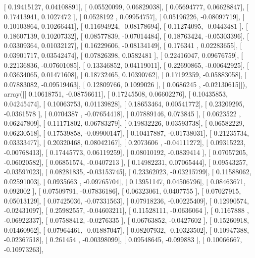 \documentclass{article}
\begin{document}
       [ 0.19415127,  0.04108891],
       [ 0.05520099,  0.06829038],
       [ 0.05694777,  0.06628847],
       [ 0.17413941,  0.1027472 ],
       [ 0.0528192 ,  0.09954757],
       [ 0.05196226, -0.08097719],
       [ 0.10103864,  0.10266441],
       [ 0.11694924, -0.08178694],
       [ 0.11274095, -0.0443481 ],
       [ 0.18607139,  0.10207332],
       [ 0.08577839, -0.07014484],
       [ 0.18763424, -0.05303396],
       [ 0.03309364,  0.01032127],
       [ 0.16229606, -0.08134149],
       [ 0.176341  ,  0.02283655],
       [ 0.03901717,  0.03542474],
       [ 0.07826398,  0.0582481 ],
       [ 0.22416047,  0.09676759],
       [ 0.22136836, -0.07601085],
       [ 0.13346852,  0.04119011],
       [ 0.22690865, -0.00642925],
       [ 0.03634065,  0.01471608],
       [ 0.18732465,  0.10390762],
       [ 0.17192359, -0.05883058],
       [ 0.07883082, -0.09519463],
       [ 0.12809766,  0.1099026 ],
       [ 0.0686245 , -0.02130615]]), array([[ 0.10618751, -0.08756611],
       [ 0.17245508,  0.06602276],
       [ 0.10435853,  0.04245474],
       [ 0.10063753,  0.01139828],
       [ 0.18653464,  0.00541772],
       [ 0.23209295, -0.0361578 ],
       [ 0.0704387 , -0.07654418],
       [ 0.07889146,  0.073845  ],
       [ 0.0623522 ,  0.06247809],
       [ 0.11171802,  0.06783279],
       [ 0.19832226,  0.03593738],
       [ 0.06582229,  0.06230518],
       [ 0.17539858, -0.09900147],
       [ 0.10417887, -0.01738031],
       [ 0.21235734,  0.03333477],
       [ 0.20320468,  0.08042167],
       [ 0.2073606 , -0.04111272],
       [ 0.09315223, -0.00768413],
       [ 0.17445773,  0.06119259],
       [ 0.08010192, -0.0839414 ],
       [ 0.07057205, -0.06020582],
       [ 0.06851574, -0.0407213 ],
       [ 0.14982231,  0.07065444],
       [ 0.09543257, -0.03597023],
       [ 0.08281835, -0.03153745],
       [ 0.23362023, -0.03215799],
       [ 0.11588062,  0.02591003],
       [ 0.0935663 , -0.09765704],
       [ 0.13951147,  0.04506796],
       [ 0.08463671,  0.092002  ],
       [ 0.07509791, -0.07836186],
       [ 0.06323061,  0.0407755 ],
       [ 0.07027915,  0.05013129],
       [ 0.07425036, -0.07331563],
       [ 0.07918236, -0.00225409],
       [ 0.12990574, -0.02431097],
       [ 0.25982557, -0.04603211],
       [ 0.11528111, -0.0636064 ],
       [ 0.1167888 , -0.06922337],
       [ 0.07588412, -0.0276335 ],
       [ 0.06763852, -0.0427602 ],
       [ 0.15260918,  0.01460962],
       [ 0.07964461, -0.01887047],
       [ 0.08207932, -0.10323502],
       [ 0.10947388, -0.02367518],
       [ 0.261454  , -0.00398099],
       [ 0.09548645, -0.099883  ],
       [ 0.10066667, -0.10973263],
\end{document}
